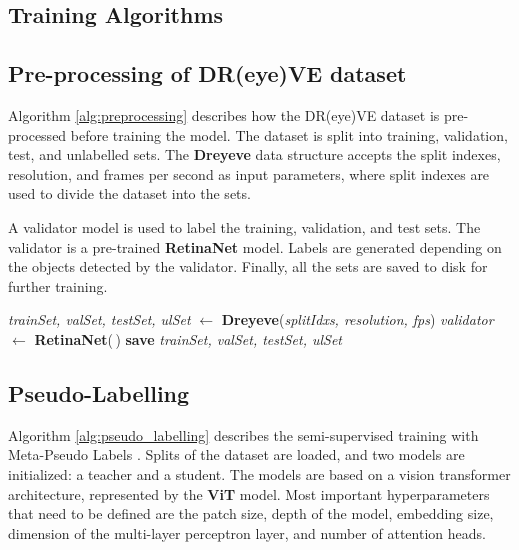 \begin{appendices}
    \chapter{Training Algorithms}
    \label{appendix:training_algorithms}
    \section{Pre-processing of DR(eye)VE dataset}
    Algorithm \ref{alg:preprocessing} describes how the DR(eye)VE dataset is 
    pre-processed before training the model. The dataset is split into training, 
    validation, test, and unlabelled sets. The \textbf{Dreyeve} data structure 
    accepts the split indexes, resolution, and frames per second as input parameters, 
    where split indexes are used to divide the dataset into the sets.

    A validator model is used to label the training, validation, and test sets. 
    The validator is a pre-trained \textbf{RetinaNet} model. Labels are generated 
    depending on the objects detected by the validator. Finally, all the sets are 
    saved to disk for further training.
    \begin{algorithm}
        \vspace{0.2cm}
        \DontPrintSemicolon
        \textit{trainSet, valSet, testSet, ulSet} $\gets$ \textbf{Dreyeve}(\textit{splitIdxs, resolution, fps})\;
        \textit{validator} $\gets$ \textbf{RetinaNet}(\,)\;
        \textbf{save} \textit{trainSet, valSet, testSet, ulSet}\;
    \end{algorithm}
    \section{Pseudo-Labelling}
    Algorithm \ref{alg:pseudo_labelling} describes the semi-supervised training 
    with Meta-Pseudo Labels \cite{pham2021meta}.
    Splits of the dataset are loaded, and two models are initialized: a teacher 
    and a student. The models are based on a vision transformer architecture, 
    represented by the \textbf{ViT} model. Most important hyperparameters that 
    need to be defined are the patch size, depth of the model, embedding size, 
    dimension of the multi-layer perceptron layer, and number of attention heads.


\end{appendices}
